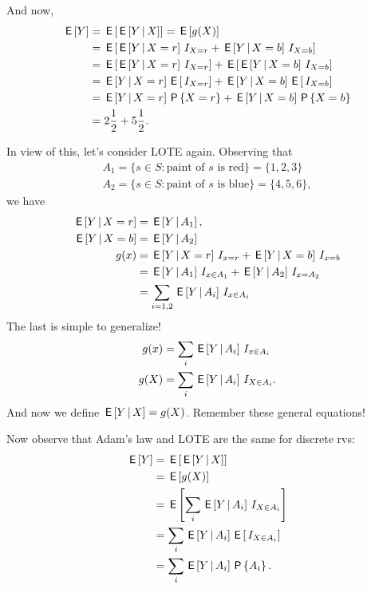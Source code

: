\documentclass[lectures]{subfiles}
\begin{document}
\begin{exercise}
\begin{solution}
And now,
\begin{align}
\E Y &= \E{\E{Y\given X}} = \E{g(X)} \\
&=\E{\E{Y\given X=r} \1{X=r} + \E{Y\given X=b} \1{X=b}}\\
&=\E{\E{Y\given X=r} \1{X=r}} + \E{\E{Y\given X=b} \1{X=b}}\\
&=\E{Y\given X=r} \E{\1{X=r}} + \E{Y\given X=b} \E{\1{X=b}}\\
&=\E{Y\given X=r} \P{X=r} + \E{Y\given X=b} \P{X=b}\\
&=2 \frac{1}{2}+ 5 \frac{1}{2}.
\end{align}

In view of this, let's consider LOTE again. Observing that
\begin{align}
A_{1} = \{s \in S : \textrm{paint of $s$ is red}\} = \{1, 2,3 \} \\
A_{2} = \{s \in S : \textrm{paint of $s$ is blue}\} = \{4, 5, 6\},
\end{align}
we have
\begin{align}
  \E{Y\given X=r} &= \E{Y\given A_{1}}, \\
  \E{Y\given X=b} &= \E{Y\given A_{2}} \\
  g(x) &= \E{Y\given X=r} \1{x=r} + \E{Y\given X=b} \1{x=b} \\
   &= \E{Y\given A_{1}} \1{x\in A_{1}} + \E{Y\given A_{2}} \1{x=A_{2}} \\
 &= \sum_{i=1,2}  \E{Y\given A_{i}} \1{x\in A_{i}}
\end{align}
The last is simple to generalize!
\begin{align}
  g(x)  &= \sum_{i}  \E{Y\given A_{i}} \1{x\in A_{i}}  \\
  g(X)  &= \sum_{i}  \E{Y\given A_{i}} \1{X\in A_{i}}.
\end{align}
And now we define $\E{Y\given X} = g(X)$. Remember these general equations!


Now observe that Adam's law and LOTE are the same for discrete rvs:
\begin{align*}
\E{Y}
&= \E{\E{Y\given X}} \\
&= \E{g(X)} \\
&=\E{\sum_{i} \E{Y\given A_{i}} \1{X\in A_{i}}} \\
&=\sum_{i}  \E{Y\given A_{i}} \E{\1{X\in A_{i}}} \\
&=\sum_{i}  \E{Y\given A_{i}} \P{A_{i}}.
\end{align*}
\end{solution}
\end{exercise}
\end{document}
